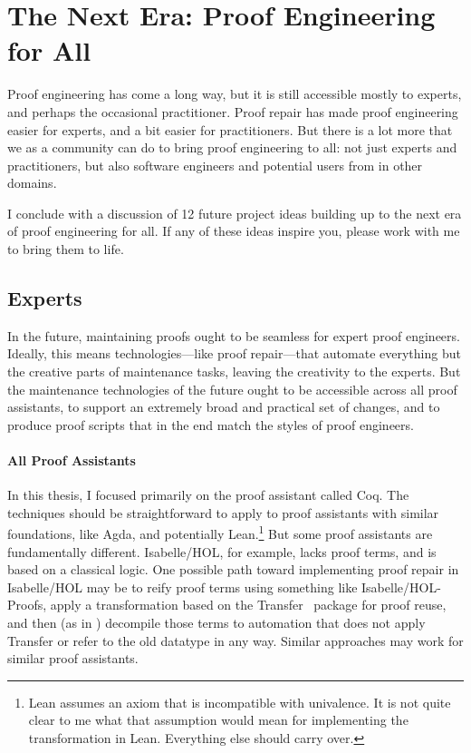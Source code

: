 \section*{The Next Era: Proof Engineering for All}


Proof engineering has come a long way, but it is still accessible mostly to experts, and perhaps the occasional practitioner.
Proof repair has made proof engineering easier for experts, and a bit easier for practitioners.
But there is a lot more that we as a community can do to bring proof engineering to all: not just experts and practitioners,
but also software engineers and potential users from in other domains.

I conclude with a discussion of 12 future project ideas building up to the next era of proof engineering for all.
If any of these ideas inspire you, please work with me to bring them to life.

\subsection*{Experts}

In the future, maintaining proofs ought to be seamless for expert proof engineers.
Ideally, this means technologies---like proof repair---that automate everything but the creative parts of maintenance tasks,
leaving the creativity to the experts.
But the maintenance technologies of the future ought to be accessible across all proof assistants,
to support an extremely broad and practical set of changes,
and to produce proof scripts that in the end match the styles of proof engineers.

\paragraph{All Proof Assistants} In this thesis, I focused primarily on the proof assistant called Coq.
The techniques should be straightforward to apply to proof assistants with similar foundations, like Agda,
and potentially Lean.\footnote{Lean assumes an axiom that is incompatible with univalence.
It is not quite clear to me what that assumption would mean for implementing the \toolnamec transformation in Lean.
Everything else should carry over.}
But some proof assistants are fundamentally different.
Isabelle/HOL, for example, lacks proof terms, and is based on a classical logic.
One possible path toward implementing proof repair in Isabelle/HOL may be to reify proof terms using something like
Isabelle/HOL-Proofs, apply a transformation based on the Transfer~\cite{Huffman2013} package for proof reuse, and then (as in \toolnamec) decompile those terms to automation that does 
not apply Transfer or refer to the old datatype in any way.
Similar approaches may work for similar proof assistants.


